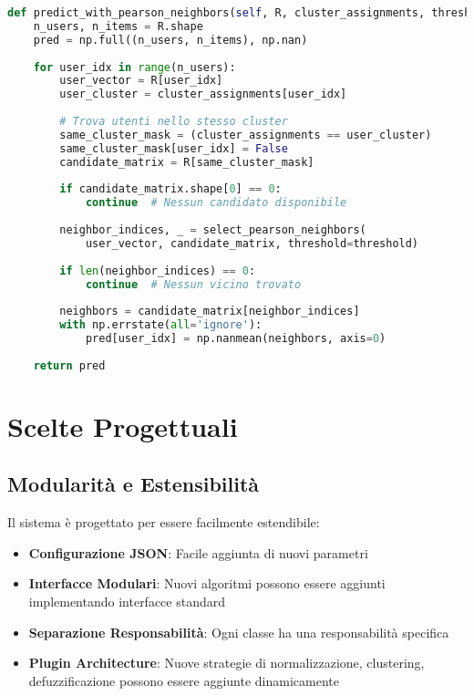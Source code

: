 \begin{lstlisting}[language=Python, caption=Gestione errori nella predizione]
def predict_with_pearson_neighbors(self, R, cluster_assignments, threshold=0.5):
    n_users, n_items = R.shape
    pred = np.full((n_users, n_items), np.nan)
    
    for user_idx in range(n_users):
        user_vector = R[user_idx]
        user_cluster = cluster_assignments[user_idx]
        
        # Trova utenti nello stesso cluster
        same_cluster_mask = (cluster_assignments == user_cluster)
        same_cluster_mask[user_idx] = False
        candidate_matrix = R[same_cluster_mask]
        
        if candidate_matrix.shape[0] == 0:
            continue  # Nessun candidato disponibile
            
        neighbor_indices, _ = select_pearson_neighbors(
            user_vector, candidate_matrix, threshold=threshold)
        
        if len(neighbor_indices) == 0:
            continue  # Nessun vicino trovato
            
        neighbors = candidate_matrix[neighbor_indices]
        with np.errstate(all='ignore'):
            pred[user_idx] = np.nanmean(neighbors, axis=0)
    
    return pred
\end{lstlisting}

\section{Scelte Progettuali}

\subsection{Modularità e Estensibilità}

Il sistema è progettato per essere facilmente estendibile:

\begin{itemize}
    \item \textbf{Configurazione JSON}: Facile aggiunta di nuovi parametri
    \item \textbf{Interfacce Modulari}: Nuovi algoritmi possono essere aggiunti implementando interfacce standard
    \item \textbf{Separazione Responsabilità}: Ogni classe ha una responsabilità specifica
    \item \textbf{Plugin Architecture}: Nuove strategie di normalizzazione, clustering, defuzzificazione possono essere aggiunte dinamicamente
\end{itemize}

